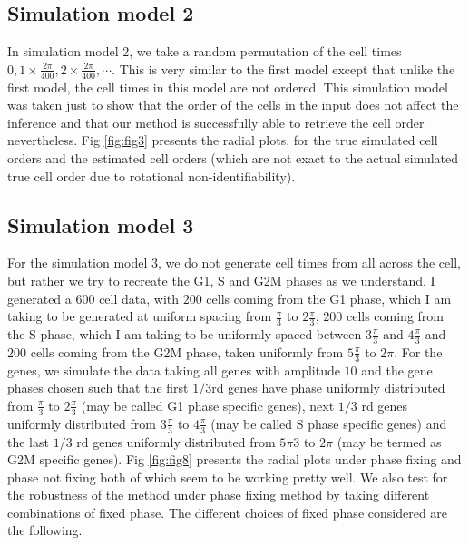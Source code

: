 \documentclass[11pt]{article}
\begin{document}
\subsection{Simulation model 2}

In simulation model 2, we take a random permutation of the cell times $0, 1 \times \frac{2 \pi}{400}, 2 \times \frac{2 \pi}{400}, \cdots $. This is very similar to the first model except that unlike the first model, the cell times in this model are not ordered. This simulation model was taken just to show that the order of the cells in the input does not affect the inference and that our method is successfully able to retrieve the cell order nevertheless. Fig \ref{fig:fig3} presents the radial plots, for the true simulated cell orders and the estimated cell orders (which are not exact to the actual simulated true cell order due to rotational non-identifiability).

\subsection{Simulation model 3}

For the simulation model 3, we do not generate cell times from all across the cell, but rather we try to recreate the G1, S and G2M phases as we understand.  I generated a $600$ cell data, with $200$ cells coming from the G1 phase, which I am taking to be generated at uniform spacing from $\frac{\pi}{3}$ to $2 \frac{\pi}{3}$, $200$ cells coming from the S phase, which I am taking to be uniformly spaced between $3 \frac{\pi}{3}$ and  $4\frac{\pi}{3}$ and $200$ cells coming from the G2M phase, taken uniformly from $5 \frac{\pi}{3}$ to $2 \pi$. For the genes, we simulate the data taking all genes with amplitude $10$ and the gene phases chosen such that the first $1/3$rd genes have phase uniformly distributed from $\frac{\pi}{3}$ to $2 \frac{\pi}{3}$ (may be called G1 phase specific genes), next $1/3$ rd genes uniformly distributed from $3 \frac{\pi}{3}$ to $4 \frac{\pi}{3}$ (may be called S phase specific genes) and the last $1/3$ rd genes uniformly distributed from $5 {\pi}{3}$ to $2 \pi$ (may be termed as G2M specific genes). Fig \ref{fig:fig8} presents the radial plots under phase fixing and phase not fixing both of which seem to be working pretty well. 
We also test for the robustness of the method under phase fixing method by taking different combinations of fixed phase. The different choices of fixed phase considered are the following.
\end{document}
